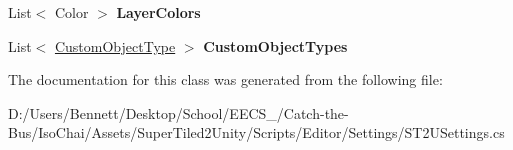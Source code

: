 \begin{DoxyCompactItemize}
List$<$ Color $>$ {\bfseries Layer\+Colors}
\item 
\mbox{\label{class_super_tiled2_unity_1_1_editor_1_1_s_t2_u_settings_a96a93160942d32e75434cf135f93d6bd}} 
List$<$ \mbox{\hyperlink{class_super_tiled2_unity_1_1_editor_1_1_custom_object_type}{Custom\+Object\+Type}} $>$ {\bfseries Custom\+Object\+Types}
\end{DoxyCompactItemize}


The documentation for this class was generated from the following file\+:\begin{DoxyCompactItemize}
\item 
D\+:/\+Users/\+Bennett/\+Desktop/\+School/\+E\+E\+C\+S\+\_/\+Catch-\/the-\/\+Bus/\+Iso\+Chai/\+Assets/\+Super\+Tiled2\+Unity/\+Scripts/\+Editor/\+Settings/S\+T2\+U\+Settings.\+cs\end{DoxyCompactItemize}
